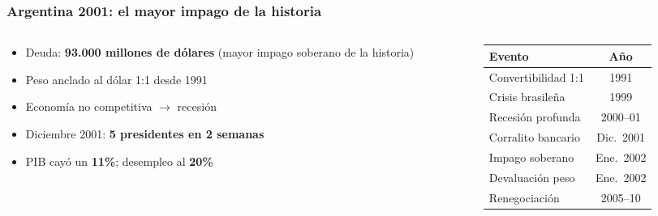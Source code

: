 \begin{frame}
\frametitle{Argentina 2001: el mayor impago de la historia}
\centering

\begin{columns}[T]
  \begin{column}{0.52\textwidth}
    \begin{itemize}
      \setlength{\itemsep}{5pt}
      \item Deuda: \textbf{93.000 millones de dólares} (mayor impago soberano de la historia)
      \item Peso anclado al dólar 1:1 desde 1991
      \item Economía no competitiva $\rightarrow$ recesión
      \item Diciembre 2001: \textbf{5 presidentes en 2 semanas}
      \item PIB cayó un \textbf{11\%}; desempleo al \textbf{20\%}
    \end{itemize}
  \end{column}
  \begin{column}{0.44\textwidth}
    \centering
    \vspace{1em}
    {\footnotesize
    \begin{tabular}{lc}
    \textbf{Evento} & \textbf{Año} \\
    \hline
    Convertibilidad 1:1 & 1991 \\
    Crisis brasileña & 1999 \\
    Recesión profunda & 2000--01 \\
    Corralito bancario & Dic.\ 2001 \\
    Impago soberano & Ene.\ 2002 \\
    Devaluación peso & Ene.\ 2002 \\
    Renegociación & 2005--10 \\
    \end{tabular}
    }
  \end{column}
\end{columns}

\end{frame}
